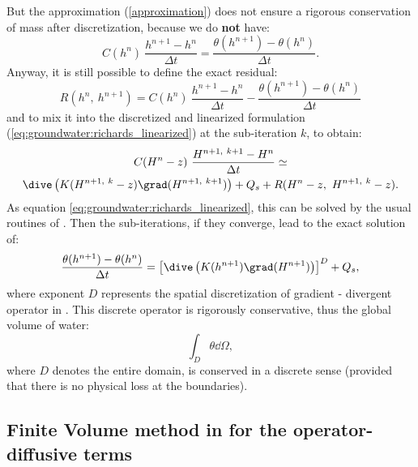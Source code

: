 But the approximation (\ref{approximation}) does not ensure a rigorous conservation of mass after discretization, because we do \textbf{not} have:
$$C(h^{n}) \ \frac{h^{n+1} - h^n}{\Delta t} = \frac{\theta(h^{n+1}) - \theta(h^n)}{\Delta t}.$$
Anyway, it is still possible to define the exact residual:
\begin{equation}
\label{residual}
  R(h^n, \ h^{n+1}) = C(h^{n}) \ \frac{h^{n+1} - h^n}{\Delta t} - \frac{\theta(h^{n+1}) - \theta(h^n)}{\Delta t}
\end{equation}
and to mix it into the discretized and linearized formulation (\ref{eq:groundwater:richards_linearized}) at the sub-iteration $k$, to obtain:
\begin{multline}
\label{eq:groundwater:richards_final}
 C(H^{n}-z) \ \frac{H^{ n+1, \ k+1} - H^n}{\Delta t} \simeq \\ \dive \left( K(H^{ n+1, \ k} - z) \grad(H^{ n+1, \ k+1}) \right) + Q_s + R(H^n - z, \ H^{ n+1, \ k} - z).
\end{multline}
As equation \eqref{eq:groundwater:richards_linearized}, this can be solved by the usual routines of \CS.
Then the sub-iterations, if they converge, lead to the exact solution of:
\begin{equation}
 \label{eq:groundwater:richards_final_bis}
\frac{ \theta(h^{n+1}) - \theta(h^n) }{\Delta t} = \left[ \dive \left( K(h^{n+1}) \grad(H^{n+1}) \right) \right]^D + Q_s,
\end{equation}
where exponent $D$ represents the spatial discretization of gradient - divergent operator in \CS.
This discrete operator
is rigorously conservative, thus the global volume of water:
$$\int_D{{\theta} \dd \Omega},$$
where $D$ denotes the entire domain, is conserved in a discrete sense (provided that there is no physical loss at the boundaries).

\subsection{Finite Volume method in \CS for the operator-diffusive terms}\label{sec:groundwater:operator_diffusive}

